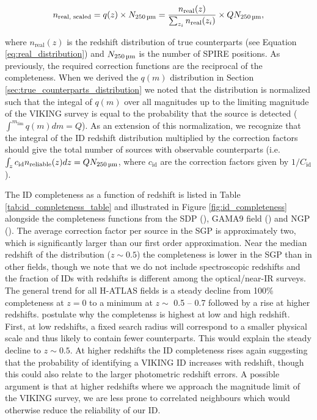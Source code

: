 \begin{equation}
    n_{\textrm{real, scaled}} = q(z)\times N_{\textrm{250\,\micron}} = \frac{n_{\textrm{real}}(z)}{\sum_{z_i}n_{\textrm{real}}(z_i)}\times QN_{\textrm{250\,\micron}},
    \label{eq:n_real_scaled}
\end{equation}

\noindent where $n_{\textrm{real}}(z)$ is the redshift distribution of true counterparts (see Equation \ref{eq:real_distribution}) and $N_{\textrm{250\,\micron}}$ is the number of SPIRE positions. As previously, the required correction functions are the reciprocal of the completeness. When we derived the $q(m)$ distribution in Section \ref{sec:true_counterparts_distribution} we noted that the distribution is normalized such that the integal of $q(m)$ over all magnitudes up to the limiting magnitude of the VIKING survey is equal to the probability that the source is detected ($\int^{m_\textrm{lim}} q(m) dm = Q$). As an extension of this normalization, we recognize that the integral of the ID redshift distribution multiplied by the correction factors should give the total number of sources with observable counterparts (i.e. $\int_z c_{\textrm{id}} n_{\textrm{reliable}}(z) dz = QN_{\textrm{250\,\micron}}$, where $c_{\textrm{id}}$ are the correction factors given by $1/C_{\textrm{id}}$).

The ID completeness as a function of redshift is listed in Table \ref{tab:id_completeness_table} and illustrated in Figure \ref{fig:id_completeness} alongside the completeness functions from the SDP (\citealt{Smith_2011}), GAMA9 field (\citealt{Fleuren_2012}) and NGP (\citealt{Bourne_2016}). The average correction factor per source in the SGP is approximately two, which is significantly larger than our first order approximation. Near the median redshift of the distribution ($z \sim 0.5$) the completeness is lower in the SGP than in other fields, though we note that we do not include spectroscopic redshifts and the fraction of IDs with redshifts is different among the optical/near-IR surveys. The general trend for all H-ATLAS fields is a steady decline from 100\% completeness at $z = 0$ to a minimum at $z \sim$ 0.5 -- 0.7 followed by a rise at higher redshifts. \citealt{Bourne_2016} postulate why the completenss is highest at low and high redshift. First, at low redshifts, a fixed search radius will correspond to a smaller physical scale and thus likely to contain fewer counterparts. This would explain the steady decline to $z \sim 0.5$. At higher redshifts the ID completeness rises again suggesting that the probability of identifying a VIKING ID increases with redshift, though this could also relate to the larger photometric redshift errors. A possible argument is that at higher redshifts where we approach the magnitude limit of the VIKING survey, we are less prone to correlated neighbours which would otherwise reduce the reliability of our ID.

